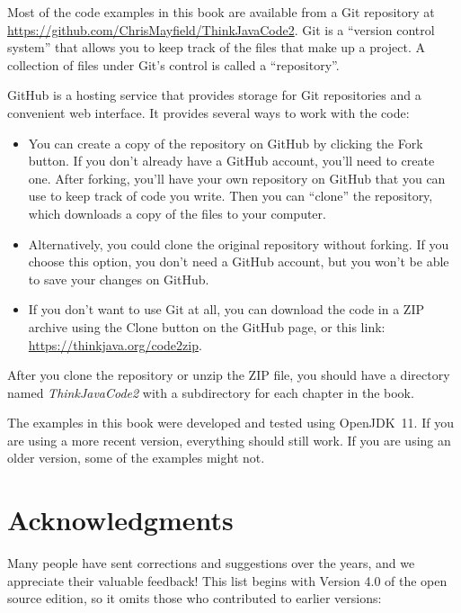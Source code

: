 Most of the code examples in this book are available from a Git repository at \url{https://github.com/ChrisMayfield/ThinkJavaCode2}.
Git is a ``version control system'' that allows you to keep track of the files that make up a project.
A collection of files under Git's control is called a ``repository''.


GitHub is a hosting service that provides storage for Git repositories and a convenient web interface.
It provides several ways to work with the code:

\begin{itemize}

\item You can create a copy of the repository on GitHub by clicking the {\sf Fork} button.
If you don't already have a GitHub account, you'll need to create one.
After forking, you'll have your own repository on GitHub that you can use to keep track of code you write.
Then you can ``clone'' the repository, which downloads a copy of the files to your computer.

\item Alternatively, you could clone the original repository without forking.
If you choose this option, you don't need a GitHub account, but you won't be able to save your changes on GitHub.

\item If you don't want to use Git at all, you can download the code in a ZIP archive using the {\sf Clone} button on the GitHub page, or this link: \url{https://thinkjava.org/code2zip}.

\end{itemize}

After you clone the repository or unzip the ZIP file, you should have a directory named {\it ThinkJavaCode2} with a subdirectory for each chapter in the book.

The examples in this book were developed and tested using OpenJDK~11.
If you are using a more recent version, everything should still work.
If you are using an older version, some of the examples might not.


\section*{Acknowledgments}

Many people have sent corrections and suggestions over the years, and we appreciate their valuable feedback!
This list begins with Version 4.0 of the open source edition, so it omits those who contributed to earlier versions:

